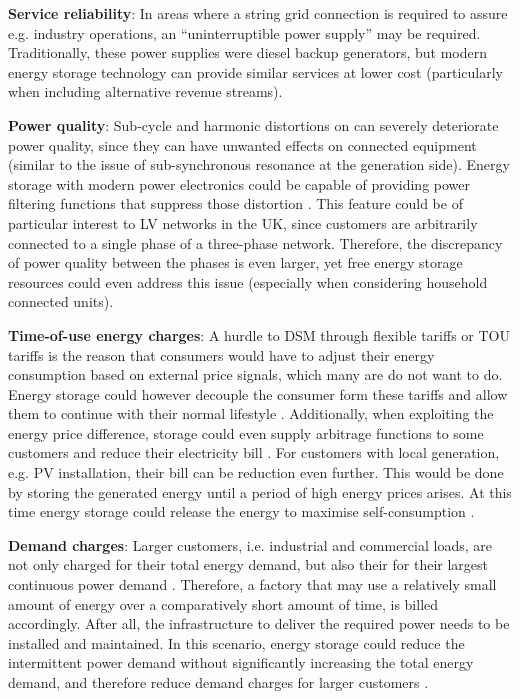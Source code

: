 \textbf{Service reliability}: In areas where a string grid connection is required to assure e.g. industry operations, an ``uninterruptible power supply'' may be required.
Traditionally, these power supplies were diesel backup generators, but modern energy storage technology can provide similar services at lower cost \cite{Schoenung2001} (particularly when including alternative revenue streams).

\textbf{Power quality}: Sub-cycle and harmonic distortions on can severely deteriorate power quality, since they can have unwanted effects on connected equipment (similar to the issue of sub-synchronous resonance at the generation side).
Energy storage with modern power electronics could be capable of providing power filtering functions that suppress those distortion \cite{Putrus2007}.
This feature could be of particular interest to LV networks in the UK, since customers are arbitrarily connected to a single phase of a three-phase network.
Therefore, the discrepancy of power quality between the phases is even larger, yet free energy storage resources could even address this issue \cite{Miret2009} (especially when considering household connected units).


\textbf{Time-of-use energy charges}: A hurdle to DSM through flexible tariffs or TOU tariffs is the reason that consumers would have to adjust their energy consumption based on external price signals, which many are do not want to do.
Energy storage could however decouple the consumer form these tariffs and allow them to continue with their normal lifestyle \cite{Khani2014}.
Additionally, when exploiting the energy price difference, storage could even supply arbitrage functions to some customers and reduce their electricity bill \cite{Nair2010a}.
For customers with local generation, e.g. PV installation, their bill can be reduction even further.
This would be done by storing the generated energy until a period of high energy prices arises.
At this time energy storage could release the energy to maximise self-consumption \cite{Luthander2016}.

\textbf{Demand charges}: Larger customers, i.e. industrial and commercial loads, are not only charged for their total energy demand, but also their for their largest continuous power demand \cite{Oudalov2007, Mackey2013}.
Therefore, a factory that may use a relatively small amount of energy over a comparatively short amount of time, is billed accordingly.
After all, the infrastructure to deliver the required power needs to be installed and maintained.
In this scenario, energy storage could reduce the intermittent power demand without significantly increasing the total energy demand, and therefore reduce demand charges for larger customers \cite{Aghaei2013}.

